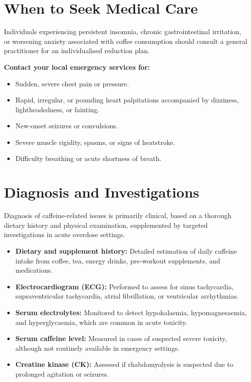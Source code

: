 \section*{When to Seek Medical Care}
Individuals experiencing persistent insomnia, chronic gastrointestinal irritation, or worsening anxiety associated with coffee consumption should consult a general practitioner for an individualised reduction plan.

\textbf{Contact your local emergency services for:}
\begin{itemize}
    \item Sudden, severe chest pain or pressure.
    \item Rapid, irregular, or pounding heart palpitations accompanied by dizziness, lightheadedness, or fainting.
    \item New-onset seizures or convulsions.
    \item Severe muscle rigidity, spasms, or signs of heatstroke.
    \item Difficulty breathing or acute shortness of breath.
\end{itemize}

\section*{Diagnosis and Investigations}
Diagnosis of caffeine-related issues is primarily clinical, based on a thorough dietary history and physical examination, supplemented by targeted investigations in acute overdose settings.
\begin{itemize}
    \item \textbf{Dietary and supplement history:} Detailed estimation of daily caffeine intake from coffee, tea, energy drinks, pre-workout supplements, and medications.
    \item \textbf{Electrocardiogram (ECG):} Performed to assess for sinus tachycardia, supraventricular tachycardia, atrial fibrillation, or ventricular arrhythmias.
    \item \textbf{Serum electrolytes:} Monitored to detect hypokalaemia, hypomagnesaemia, and hyperglycaemia, which are common in acute toxicity.
    \item \textbf{Serum caffeine level:} Measured in cases of suspected severe toxicity, although not routinely available in emergency settings.
    \item \textbf{Creatine kinase (CK):} Assessed if rhabdomyolysis is suspected due to prolonged agitation or seizures.
\end{itemize}


